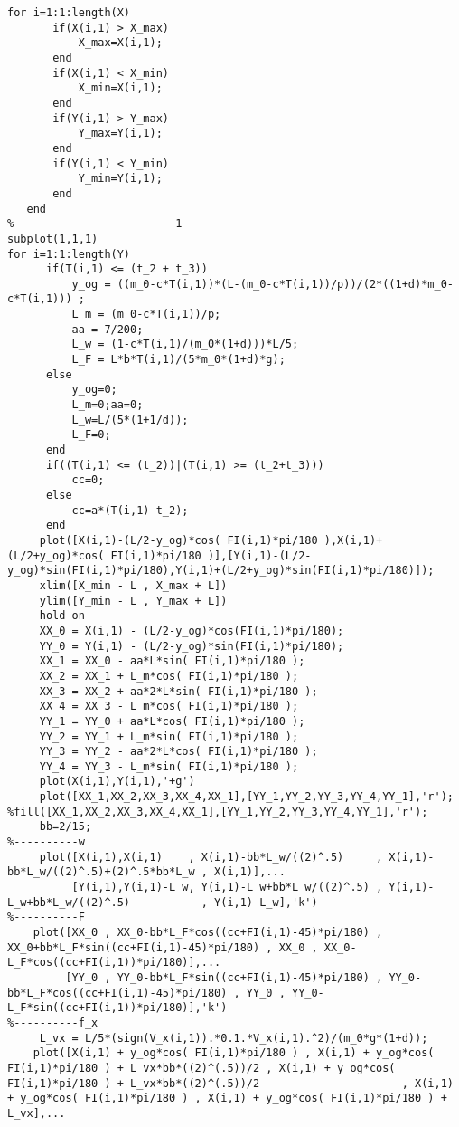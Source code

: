 \documentclass[UTF8]{article}
\begin{document}
\begin{appendix}
\begin{lstlisting}[title=main.m, frame=shadowbox]
   for i=1:1:length(X)
       if(X(i,1) > X_max)
           X_max=X(i,1);
       end
       if(X(i,1) < X_min)
           X_min=X(i,1);
       end
       if(Y(i,1) > Y_max)
           Y_max=Y(i,1);
       end
       if(Y(i,1) < Y_min)
           Y_min=Y(i,1);
       end
   end
%-------------------------1---------------------------   
subplot(1,1,1)
for i=1:1:length(Y)
      if(T(i,1) <= (t_2 + t_3)) 
          y_og = ((m_0-c*T(i,1))*(L-(m_0-c*T(i,1))/p))/(2*((1+d)*m_0-c*T(i,1))) ;     
          L_m = (m_0-c*T(i,1))/p;
          aa = 7/200;
          L_w = (1-c*T(i,1)/(m_0*(1+d)))*L/5;
          L_F = L*b*T(i,1)/(5*m_0*(1+d)*g);
      else
          y_og=0;
          L_m=0;aa=0;
          L_w=L/(5*(1+1/d));
          L_F=0;               
      end
      if((T(i,1) <= (t_2))|(T(i,1) >= (t_2+t_3))) 
          cc=0;
      else 
          cc=a*(T(i,1)-t_2);
      end
     plot([X(i,1)-(L/2-y_og)*cos( FI(i,1)*pi/180 ),X(i,1)+(L/2+y_og)*cos( FI(i,1)*pi/180 )],[Y(i,1)-(L/2-y_og)*sin(FI(i,1)*pi/180),Y(i,1)+(L/2+y_og)*sin(FI(i,1)*pi/180)]);
     xlim([X_min - L , X_max + L])
     ylim([Y_min - L , Y_max + L])
     hold on
     XX_0 = X(i,1) - (L/2-y_og)*cos(FI(i,1)*pi/180);
     YY_0 = Y(i,1) - (L/2-y_og)*sin(FI(i,1)*pi/180);
     XX_1 = XX_0 - aa*L*sin( FI(i,1)*pi/180 );
     XX_2 = XX_1 + L_m*cos( FI(i,1)*pi/180 );
     XX_3 = XX_2 + aa*2*L*sin( FI(i,1)*pi/180 );
     XX_4 = XX_3 - L_m*cos( FI(i,1)*pi/180 );
     YY_1 = YY_0 + aa*L*cos( FI(i,1)*pi/180 );
     YY_2 = YY_1 + L_m*sin( FI(i,1)*pi/180 );
     YY_3 = YY_2 - aa*2*L*cos( FI(i,1)*pi/180 );
     YY_4 = YY_3 - L_m*sin( FI(i,1)*pi/180 );
     plot(X(i,1),Y(i,1),'+g')
     plot([XX_1,XX_2,XX_3,XX_4,XX_1],[YY_1,YY_2,YY_3,YY_4,YY_1],'r');
%fill([XX_1,XX_2,XX_3,XX_4,XX_1],[YY_1,YY_2,YY_3,YY_4,YY_1],'r');
     bb=2/15;     
%----------w
     plot([X(i,1),X(i,1)    , X(i,1)-bb*L_w/((2)^.5)     , X(i,1)-bb*L_w/((2)^.5)+(2)^.5*bb*L_w , X(i,1)],...
          [Y(i,1),Y(i,1)-L_w, Y(i,1)-L_w+bb*L_w/((2)^.5) , Y(i,1)-L_w+bb*L_w/((2)^.5)           , Y(i,1)-L_w],'k')
%----------F
    plot([XX_0 , XX_0-bb*L_F*cos((cc+FI(i,1)-45)*pi/180) , XX_0+bb*L_F*sin((cc+FI(i,1)-45)*pi/180) , XX_0 , XX_0-L_F*cos((cc+FI(i,1))*pi/180)],...
         [YY_0 , YY_0-bb*L_F*sin((cc+FI(i,1)-45)*pi/180) , YY_0-bb*L_F*cos((cc+FI(i,1)-45)*pi/180) , YY_0 , YY_0-L_F*sin((cc+FI(i,1))*pi/180)],'k')
%----------f_x
     L_vx = L/5*(sign(V_x(i,1)).*0.1.*V_x(i,1).^2)/(m_0*g*(1+d));
    plot([X(i,1) + y_og*cos( FI(i,1)*pi/180 ) , X(i,1) + y_og*cos( FI(i,1)*pi/180 ) + L_vx*bb*((2)^(.5))/2 , X(i,1) + y_og*cos( FI(i,1)*pi/180 ) + L_vx*bb*((2)^(.5))/2                      , X(i,1) + y_og*cos( FI(i,1)*pi/180 ) , X(i,1) + y_og*cos( FI(i,1)*pi/180 ) + L_vx],...

\end{lstlisting}
\end{appendix}
\end{document}
